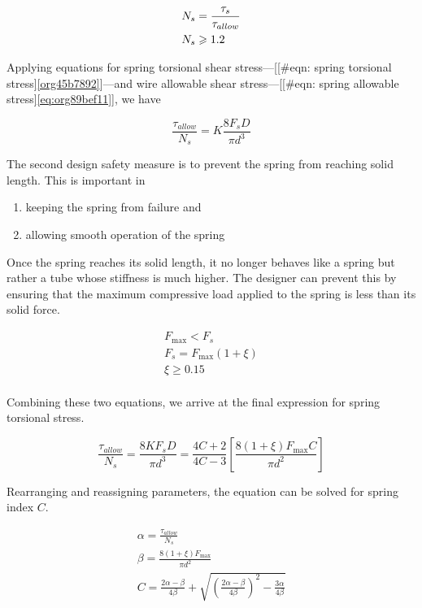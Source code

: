 \documentclass[a4paper,openany,12pt]{book}
\begin{document}
{{\begin{gather}
\label{eq:org89bef11}
  N_s = \frac{\tau _s}{\tau _{allow}} \hfill \\
  N_s \geqslant 1.2 \hfill \\ 
\end{gather}

Applying equations for spring torsional shear
stress---[[\#eqn: spring torsional stress]\ref{org45b7892}]---and
wire allowable shear
stress---[[\#eqn: spring allowable stress]\ref{eq:org89bef11}],
we have

$$\frac{\tau _{allow}}{N_s} = K\frac{8F_sD}{\pi d^3}$$

The second design safety measure is to prevent the spring from reaching
solid length. This is important in

\begin{enumerate}
\item keeping the spring from failure and

\item allowing smooth operation of the spring
\end{enumerate}

Once the spring reaches its solid length, it no longer behaves like a
spring but rather a tube whose stiffness is much higher. The designer
can prevent this by ensuring that the maximum compressive load applied
to the spring is less than its solid force.

$$\begin{gathered}
    F_{\max} < F_s \\ 
    F_s = F_{\max}(1 + \xi ) \\ 
    \xi  \geqslant 0.15 \\ 
  \end{gathered}$$

Combining these two equations, we arrive at the final expression for
spring torsional stress.

$$\frac{\tau _{allow}}{N_s} = \frac{8KF_sD}{\pi d^3} = \frac{4C + 2}{4C - 3}\left[ \frac{8(1 + \xi )F_{\max }C}{\pi d^2} \right]$$

Rearranging and reassigning parameters, the equation can be solved for
spring index \(C\).

$$\begin{gathered}
    \alpha  = \frac{\tau_{allow}}{N_s} \\ 
    \beta  = \frac{8(1 + \xi )F_{\max}}{\pi d^2} \\ 
    C = \frac{2\alpha  - \beta }{4\beta} + \sqrt {\left( \frac{2\alpha  - \beta}{4\beta} \right)^2 - \frac{3\alpha}{4\beta}}  \\ 
  \end{gathered}$$

}}
\end{document}
